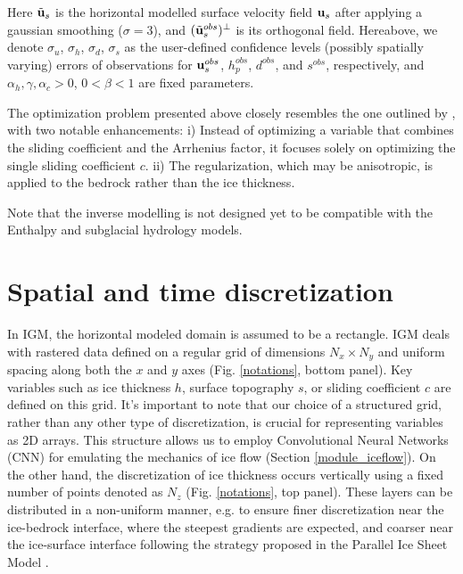 \documentclass[10pt,twocolumn]{article}
\begin{document}
Here $\tilde{{\bf u}}_s$ is the horizontal modelled surface velocity 
field ${\bf u}_s$ after applying a gaussian smoothing ($\sigma=3$),
 and $(\tilde{{\bf u}}_s^{obs})^{\perp}$ is its orthogonal field. 
Hereabove, we denote $\sigma_u$, $\sigma_h$, $\sigma_d$, $\sigma_s$ 
as the user-defined confidence levels (possibly spatially varying) 
errors of observations for ${\bf u}_s^{obs}$, $h_p^{obs}$, $d^{obs}$, and $s^{obs}$, 
respectively, and $\alpha_h, \gamma, \alpha_c>0$, $0<\beta<1$ are fixed parameters.

The optimization problem presented above closely resembles the one outlined 
by \citet{jouvet2023inversion}, with two notable enhancements:
i) Instead of optimizing a variable that combines the sliding coefficient 
and the Arrhenius factor, it focuses solely on optimizing the single sliding coefficient $c$.
ii) The regularization, which may be anisotropic, 
is applied to the bedrock rather than the ice thickness.

Note that the inverse modelling is not designed yet to be compatible with 
the Enthalpy and subglacial hydrology models.
 
\section{Spatial and time discretization} 
\label{sec_discretization}

In IGM, the horizontal modeled domain is assumed to be a rectangle. 
IGM deals with rastered data defined on a regular grid of dimensions $N_x \times N_y$ 
and uniform spacing along both the $x$ and $y$ axes (Fig. \ref{notations}, bottom panel). 
Key variables such as ice thickness $h$, 
surface topography $s$, or sliding coefficient $c$ are defined on this grid.
It's important to note that our choice of a structured grid, rather than any other type of
discretization, is crucial for representing variables as 2D arrays. This structure allows us 
to employ Convolutional Neural Networks (CNN) for emulating the mechanics of ice flow 
(Section \ref{module_iceflow}).
On the other hand, the discretization of ice thickness occurs vertically using a fixed 
number of points denoted as $N_z$ (Fig. \ref{notations}, top panel).
These layers can be distributed in a non-uniform manner, e.g. to ensure finer discretization
near the ice-bedrock interface, where the steepest gradients are expected, 
and coarser near the ice-surface interface following the strategy proposed in 
the Parallel Ice Sheet Model \citep[PISM,][]{pism-user-manual}.
\end{document}
